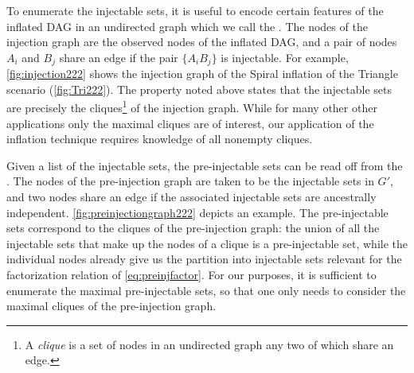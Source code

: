 \documentclass[aps,english,superscriptaddress,onecolumn,twoside,longbibliography,pra,floatfix,fleqn,nofootinbib]{revtex4-1}%
\newcommand*{\tblue}[1]{{\color{MidnightBlue}{\textbf{#1}}}}
\theoremstyle{definition}
\newcommand{\An}[2][]{{\mathsf{An}_{#1}}\parenths{#2}}
\DeclarePairedDelimiter{\parenths}{\lparen}{\rparen}
\begin{document}
To enumerate the injectable sets, it is useful to encode certain features of the inflated DAG in an undirected graph which we call the \tblue{injection graph}. The nodes of the injection graph are the observed nodes of the inflated DAG, and a pair of nodes $A_i$ and $B_j$ share an edge if the pair $\{ A_i B_j\}$ is injectable. For example, \cref{fig:injection222} shows the injection graph of the  Spiral inflation of the Triangle scenario (\cref{fig:Tri222}).
The property noted above states that the injectable sets are precisely the cliques\footnote{A \emph{clique} is a set of nodes in an undirected graph any two of which share an edge.} of the injection graph.
While for many other other applications only the maximal cliques are of interest, our application of the inflation technique requires knowledge of all nonempty cliques. 

Given a list of the injectable sets, the pre-injectable sets can be read off from the \tblue{pre-injection graph}.
The nodes of the pre-injection graph are taken to be the injectable sets in $G'$, and two nodes share an edge if the associated injectable sets are ancestrally independent. %
\cref{fig:preinjectiongraph222} depicts an example. 
The pre-injectable sets correspond to the cliques of the pre-injection graph: the union of all the injectable sets that make up the nodes of a clique is a pre-injectable set, while the individual nodes already give us the partition into injectable sets relevant for the factorization relation of \cref{eq:preinjfactor}. 
For our purposes, it is sufficient to enumerate the maximal pre-injectable sets, so that one only needs to consider the maximal cliques of the pre-injection graph.
\end{document}
